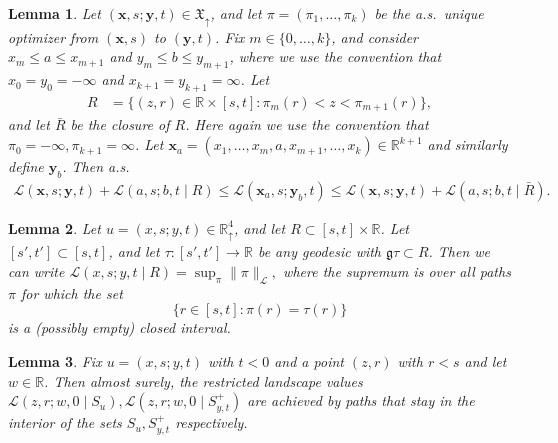 \documentclass[10pt,a4paper]{amsart}
\newtheorem{lemma}{Lemma}
\newcommand{\R}{\mathbb{R}}
\newcommand{\Rd}{\mathbb{R}^4_\uparrow}
\newcommand{\X}{\times}
\newcommand{\bx}{\mathbf{x}}
\newcommand{\by}{\mathbf{y}}
\newcommand{\cL}{\mathcal{L}}
\begin{document}
\begin{lemma}
	\label{L:strong-quadrangle}
	Let $(\bx, s; \by, t) \in \mathfrak X_\uparrow$, and let $\pi = (\pi_1, \dots, \pi_k)$ be the a.s.\ unique optimizer from $(\bx, s)$ to $(\by, t)$. Fix  $m \in \{0, \dots, k\}$, and consider $x_m \le a \le x_{m+1}$ and $y_m \le b \le y_{m+1}$, where we use the convention that $x_0 = y_0 = -\infty$ and $x_{k+1} = y_{k+1} = \infty$. Let 
	\begin{align*}
	R &= \{(z, r) \in \R \X [s, t] : \pi_m(r) < z < \pi_{m+1}(r)\},
	\end{align*}
	and let $\bar R$ be the closure of $R$. Here again we use the convention that $\pi_0 = -\infty, \pi_{k+1} = \infty$. 
	Let $\bx_a = (x_1, \dots, x_m, a, x_{m+1}, \dots, x_k) \in \R^{k+1}$ and similarly define $\by_b$. Then a.s.\
	\begin{align}
	\label{E:xsyt-cha}
	\cL(\bx, s; \by, t) + \cL(a, s; b, t \mid R) \le \cL(\bx_a, s; \by_b, t) \le \cL(\bx, s; \by, t) + \cL(a, s; b, t \mid \bar R).
	\end{align}
\end{lemma}

\begin{lemma}
	\label{L:one-side-bound}
Let $u =(x, s; y, t) \in \Rd$, and let $R \subset [s, t] \times \R$. Let $[s', t'] \subset [s, t]$, and let $\tau:[s', t'] \to \R$ be any geodesic with $\mathfrak g \tau \subset R$. Then we can write
$
\cL(x, s; y, t \mid R) = \sup_\pi \|\pi\|_\cL,
$
where the supremum is over all paths $\pi$ for which the set
$$
\{r \in [s, t] : \pi(r) = \tau(r)\}
$$
is a (possibly empty) closed interval.
\end{lemma}

\begin{lemma}
	\label{L:stays-inside}
Fix $u = (x, s; y, t)$ with $t < 0$ and a point $(z, r)$ with $r < s$ and let $w \in \R$. Then almost surely, the restricted landscape values $\cL(z, r; w, 0 \mid S_u), \cL(z, r; w, 0 \mid S_{y, t}^+)$ are achieved by paths that stay in the interior of the sets $S_u, S_{y, t}^+$ respectively.
\end{lemma}
\end{document}
